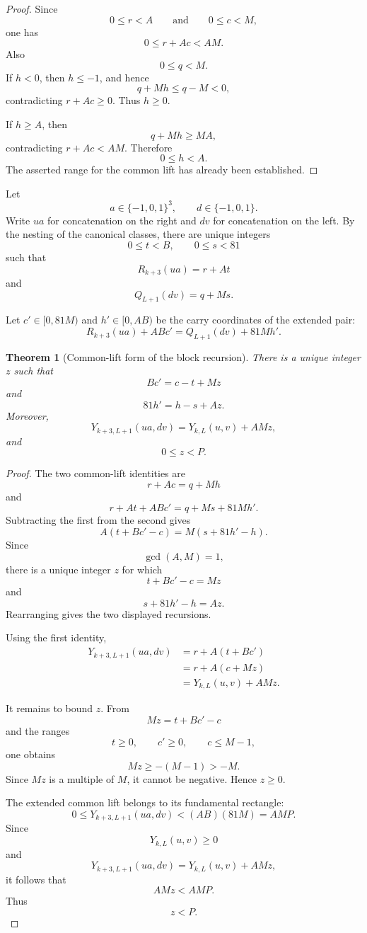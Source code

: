 \documentclass[11pt]{article}
\newtheorem{theorem}{Theorem}[section]
\theoremstyle{remark}
\newcommand{\E}{\{-1,0,1\}}
\begin{document}
\begin{proof}
Since
\[
0\le r<A
\qquad\text{and}\qquad
0\le c<M,
\]
one has
\[
0\le r+Ac<AM.
\]
Also
\[
0\le q<M.
\]
If \(h<0\), then \(h\le-1\), and hence
\[
q+Mh\le q-M<0,
\]
contradicting \(r+Ac\ge0\).  Thus \(h\ge0\).

If \(h\ge A\), then
\[
q+Mh\ge MA,
\]
contradicting \(r+Ac<AM\).  Therefore
\[
0\le h<A.
\]
The asserted range for the common lift has already been established.
\end{proof}

Let
\[
a\in\E^3,
\qquad
d\in\E.
\]
Write \(ua\) for concatenation on the right and \(dv\) for concatenation on the left.  By the nesting of the canonical classes, there are unique integers
\[
0\le t<B,
\qquad
0\le s<81
\]
such that
\[
R_{k+3}(ua)=r+At
\]
and
\[
Q_{L+1}(dv)=q+Ms.
\]

Let \(c'\in[0,81M)\) and \(h'\in[0,AB)\) be the carry coordinates of the extended pair:
\[
R_{k+3}(ua)+ABc'
=
Q_{L+1}(dv)+81Mh'.
\]

\begin{theorem}[Common-lift form of the block recursion]
\label{thm:common-lift}
There is a unique integer \(z\) such that
\[
Bc'=c-t+Mz
\]
and
\[
81h'=h-s+Az.
\]
Moreover,
\[
Y_{k+3,L+1}(ua,dv)
=
Y_{k,L}(u,v)+AMz,
\]
and
\[
0\le z<P.
\]
\end{theorem}

\begin{proof}
The two common-lift identities are
\[
r+Ac=q+Mh
\]
and
\[
r+At+ABc'=q+Ms+81Mh'.
\]
Subtracting the first from the second gives
\[
A(t+Bc'-c)=M(s+81h'-h).
\]
Since
\[
\gcd(A,M)=1,
\]
there is a unique integer \(z\) for which
\[
t+Bc'-c=Mz
\]
and
\[
s+81h'-h=Az.
\]
Rearranging gives the two displayed recursions.

Using the first identity,
\begin{align*}
Y_{k+3,L+1}(ua,dv)
&=r+A(t+Bc')\\
&=r+A(c+Mz)\\
&=Y_{k,L}(u,v)+AMz.
\end{align*}

It remains to bound \(z\).  From
\[
Mz=t+Bc'-c
\]
and the ranges
\[
t\ge0,\qquad c'\ge0,\qquad c\le M-1,
\]
one obtains
\[
Mz\ge-(M-1)>-M.
\]
Since \(Mz\) is a multiple of \(M\), it cannot be negative.  Hence \(z\ge0\).

The extended common lift belongs to its fundamental rectangle:
\[
0\le Y_{k+3,L+1}(ua,dv)<(AB)(81M)=AMP.
\]
Since
\[
Y_{k,L}(u,v)\ge0
\]
and
\[
Y_{k+3,L+1}(ua,dv)
=
Y_{k,L}(u,v)+AMz,
\]
it follows that
\[
AMz<AMP.
\]
Thus
\[
z<P.
\]
\end{proof}
\end{document}
